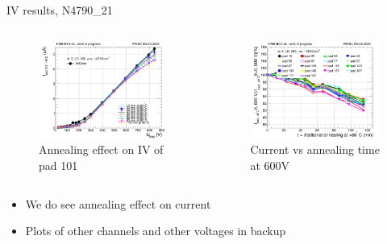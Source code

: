 \documentclass{beamer}
\begin{document}
\begin{frame}{IV results, N4790\_21}
   \begin{columns}
        \begin{figure}
            \includegraphics[width=1.0\textwidth]{plots/annealing_IV_ch101_N4790_21.png}
            \caption{Annealing effect on IV of pad 101}
        \end{figure}

        \begin{figure}
            \includegraphics[width=1.0\textwidth]{plots/annealing_current_N4790_21.png}
            \caption{Current vs annealing time at 600V}
        \end{figure}
    \end{columns}
    \begin{itemize}
        \item We do see annealing effect on current
        \item Plots of other channels and other voltages in backup
    \end{itemize}
\end{frame}
\end{document}

